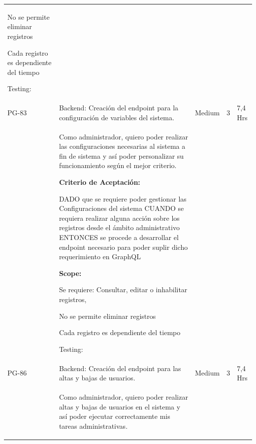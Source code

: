 \documentclass[11pt]{charter}
\begin{document}
\begin{landscape}
\begin{tabularx}{\linewidth}{@{}|p{1.3cm}|p{17cm}|p{1.7cm}|p{1.5cm}|p{1.7cm}|@{}}
\begin{description}
                         \item No se permite eliminar registros 
                         \item Cada registro es dependiente del tiempo                 
                   \item Testing:
            \end{description}     &  &     & \\
PG-83    & Backend: Creación del endpoint   para la configuración de variables del sistema.     & Medium             & 3   & 7,4  Hrs          \\
         &  \begin{description}                 
                   \item Como administrador, quiero poder   realizar las configuraciones necesarias al sistema a fin de sistema y así   poder personalizar su funcionamiento según el mejor criterio.                 
                   \item \textbf{Criterio de Aceptación:}                 
                   \item DADO que se requiere poder gestionar las Configuraciones del sistema CUANDO se requiera realizar alguna acción sobre los registros desde el   ámbito administrativo ENTONCES se procede a desarrollar el endpoint necesario para poder suplir dicho requerimiento en GraphQL                
                   \item \textbf{Scope:}                  
                         \item Se requiere: Consultar, editar o inhabilitar registros, 
                         \item No se permite eliminar registros 
                         \item Cada registro es dependiente del tiempo                 
                   \item Testing:
            \end{description}             &  &     & \\
PG-86    & Backend: Creación del endpoint   para las altas y bajas de usuarios.                 & Medium             & 3   & 7,4  Hrs          \\
         &  \begin{description}                 
                   \item Como administrador, quiero poder   realizar altas y bajas de usuarios en el sistema y así poder ejecutar   correctamente mis tareas administrativas.                 

\end{description}
\end{tabularx}
\end{landscape}
\end{document}
